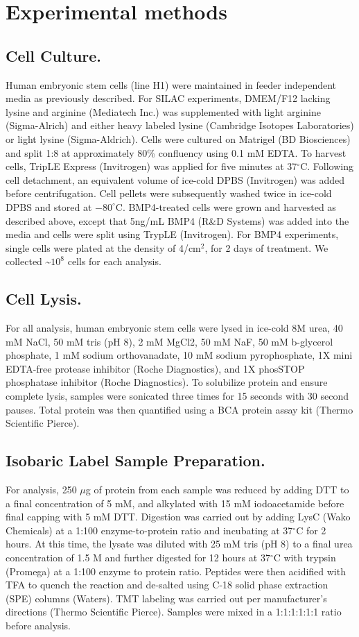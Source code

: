 \section{Experimental methods}

\subsection{Cell Culture.}
Human embryonic stem cells (line H1) were maintained in feeder independent media as previously described.\cite{feeder} For SILAC experiments, DMEM/F12 lacking lysine and arginine (Mediatech Inc.) was supplemented with light arginine (Sigma-Alrich) and either heavy labeled lysine (Cambridge Isotopes Laboratories) or light lysine (Sigma-Aldrich). Cells were cultured on Matrigel (BD Biosciences) and split 1:8 at approximately 80\% confluency using 0.1 mM EDTA. To harvest cells, TripLE Express (Invitrogen) was applied for five minutes at 37$^\circ$C. Following cell detachment, an equivalent volume of ice-cold DPBS (Invitrogen) was added before centrifugation. Cell pellets were subsequently washed twice in ice-cold DPBS and stored at $-80^\circ$C. BMP4-treated cells were grown and harvested as described above, except that 5ng/mL BMP4 (R\&D Systems) was added into the media and cells were split using TrypLE (Invitrogen). For BMP4 experiments, single cells were plated at the density of 4/cm$^2$, for 2 days of treatment. We collected \textasciitilde$10^8$ cells for each analysis.

\subsection{Cell Lysis.}
For all analysis, human embryonic stem cells were lysed in ice-cold 8M urea, 40 mM NaCl, 50 mM tris (pH 8), 2 mM MgCl2, 50 mM NaF, 50 mM b-glycerol phosphate, 1 mM sodium orthovanadate, 10 mM sodium pyrophosphate, 1X mini EDTA-free protease inhibitor (Roche Diagnostics), and 1X phosSTOP phosphatase inhibitor (Roche Diagnostics). To solubilize protein and ensure complete lysis, samples were sonicated three times for 15 seconds with 30 second pauses. Total protein was then quantified using a BCA protein assay kit (Thermo Scientific Pierce).

\subsection{Isobaric Label Sample Preparation.}
For analysis, 250 $\mu$g of protein from each sample was reduced by adding DTT to a final concentration of 5 mM, and alkylated with 15 mM iodoacetamide before final capping with 5 mM DTT. Digestion was carried out by adding LysC (Wako Chemicals) at a 1:100 enzyme-to-protein ratio and incubating at 37$^\circ$C for 2 hours. At this time, the lysate was diluted with 25 mM tris (pH 8) to a final urea concentration of 1.5 M and further digested for 12 hours at 37$^\circ$C with trypsin (Promega) at a 1:100 enzyme to protein ratio. Peptides were then acidified with TFA to quench the reaction and de-salted using C-18 solid phase extraction (SPE) columns (Waters). TMT labeling was carried out per manufacturer's directions (Thermo Scientific Pierce). Samples were mixed in a 1:1:1:1:1:1 ratio before analysis.

